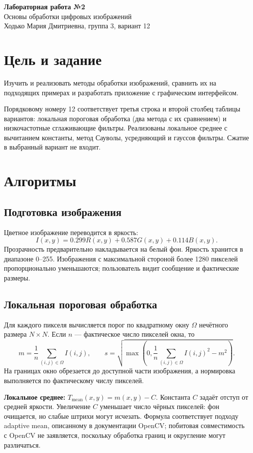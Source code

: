\documentclass[12pt,a4paper]{article}
\begin{document}
\begin{center}
{\large\bfseries Лабораторная работа №2}\\
Основы обработки цифровых изображений\\
Ходько Мария Дмитриевна, группа 3, вариант 12
\end{center}

\section{Цель и задание}
Изучить и реализовать методы обработки изображений, сравнить их на подходящих примерах и разработать приложение с графическим интерфейсом.

Порядковому номеру 12 соответствует третья строка и второй столбец таблицы вариантов: локальная пороговая обработка (два метода с их сравнением) и низкочастотные сглаживающие фильтры. Реализованы локальное среднее с вычитанием константы, метод Сауволы, усредняющий и гауссов фильтры. Сжатие в выбранный вариант не входит.

\section{Алгоритмы}
\subsection{Подготовка изображения}
Цветное изображение переводится в яркость:
\[I(x,y)=0.299R(x,y)+0.587G(x,y)+0.114B(x,y).\]
Прозрачность предварительно накладывается на белый фон. Яркость хранится в диапазоне 0--255. Изображения с максимальной стороной более 1280 пикселей пропорционально уменьшаются; пользователь видит сообщение и фактические размеры.

\subsection{Локальная пороговая обработка}
Для каждого пикселя вычисляется порог по квадратному окну $\Omega$ нечётного размера $N\times N$. Если $n$ --- фактическое число пикселей окна, то
\[m=\frac1n\sum_{(i,j)\in\Omega} I(i,j),\qquad s=\sqrt{\max\left(0,\frac1n\sum_{(i,j)\in\Omega}I(i,j)^2-m^2\right)}.\]
На границах окно обрезается до доступной части изображения, а нормировка выполняется по фактическому числу пикселей.

\textbf{Локальное среднее:} $T_{\mathrm{mean}}(x,y)=m(x,y)-C$. Константа $C$ задаёт отступ от средней яркости. Увеличение $C$ уменьшает число чёрных пикселей: фон очищается, но слабые штрихи могут исчезать. Формула соответствует подходу adaptive mean, описанному в документации OpenCV; побитовая совместимость с OpenCV не заявляется, поскольку обработка границ и округление могут различаться.
\end{document}
